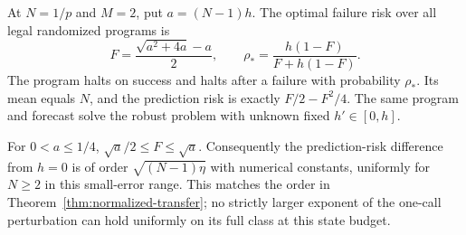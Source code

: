 \begin{theorem}\label{thm:rare-instrument}
At $N=1/p$ and $M=2$, put $a=(N-1)h$. The optimal failure risk over all legal randomized programs is
\begin{equation}\label{eq:two-state-instrument}
 F=\frac{\sqrt{a^2+4a}-a}{2},\qquad
 \rho_* =\frac{h(1-F)}{F+h(1-F)}.
\end{equation}
The program halts on success and halts after a failure with probability $\rho_*$. Its mean equals $N$, and the prediction risk is exactly $F/2-F^2/4$. The same program and forecast solve the robust problem with unknown fixed $h'\in[0,h]$.

For $0<a\le1/4$, $\sqrt a/2\le F\le\sqrt a$. Consequently the prediction-risk difference from $h=0$ is of order
$\sqrt{(N-1)\eta}$ with numerical constants, uniformly for $N\ge2$ in this small-error range. This matches the order in Theorem~\ref{thm:normalized-transfer}; no strictly larger exponent of the one-call perturbation can hold uniformly on its full class at this state budget.
\end{theorem}
